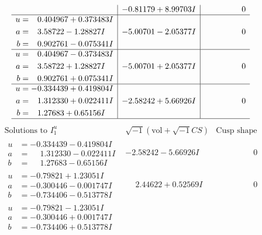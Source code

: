 \documentclass[1p]{elsarticle_modified}
\theoremstyle{definition}
\newcommand{\I}{\sqrt{-1}}
\begin{document}
$$\begin{array}{c|c|c}
 & -0.81179 + 8.99703 I & \phantom{-0.000000 } 0 \\ \hline\begin{aligned}
u &= \phantom{-}0.404967 + 0.373483 I \\
a &= \phantom{-}3.58722 - 1.28827 I \\
b &= \phantom{-}0.902761 - 0.075341 I\end{aligned}
 & -5.00701 - 2.05377 I & \phantom{-0.000000 } 0 \\ \hline\begin{aligned}
u &= \phantom{-}0.404967 - 0.373483 I \\
a &= \phantom{-}3.58722 + 1.28827 I \\
b &= \phantom{-}0.902761 + 0.075341 I\end{aligned}
 & -5.00701 + 2.05377 I & \phantom{-0.000000 } 0 \\ \hline\begin{aligned}
u &= -0.334439 + 0.419804 I \\
a &= \phantom{-}1.312330 + 0.022411 I \\
b &= \phantom{-}1.27683 + 0.65156 I\end{aligned}
 & -2.58242 + 5.66926 I & \phantom{-0.000000 } 0\\
 \hline 
 \end{array}$$\newpage$$\begin{array}{c|c|c}  
\text{Solutions to }I^u_{1}& \I (\text{vol} + \sqrt{-1}CS) & \text{Cusp shape}\\
 \hline 
\begin{aligned}
u &= -0.334439 - 0.419804 I \\
a &= \phantom{-}1.312330 - 0.022411 I \\
b &= \phantom{-}1.27683 - 0.65156 I\end{aligned}
 & -2.58242 - 5.66926 I & \phantom{-0.000000 } 0 \\ \hline\begin{aligned}
u &= -0.79821 + 1.23051 I \\
a &= -0.300446 - 0.001747 I \\
b &= -0.734406 - 0.513778 I\end{aligned}
 & \phantom{-}2.44622 + 0.52569 I & \phantom{-0.000000 } 0 \\ \hline\begin{aligned}
u &= -0.79821 - 1.23051 I \\
a &= -0.300446 + 0.001747 I \\
b &= -0.734406 + 0.513778 I\end{aligned}

\end{array}$$
\end{document}
